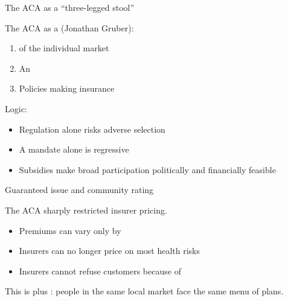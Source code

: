 \begin{frame}{The ACA as a ``three-legged stool''}

    The ACA as a  (Jonathan Gruber):
    \begin{enumerate}
        \item {} of the individual market
        \item An 
        \item Policies making insurance 
    \end{enumerate}

    \vspace{3mm}

    Logic:
    \begin{itemize}
        \item Regulation alone risks adverse selection
        \item A mandate alone is regressive
        \item Subsidies make broad participation politically and financially feasible
    \end{itemize}

\end{frame}
\begin{frame}{Guaranteed issue and community rating}

    The ACA sharply restricted insurer pricing.
    \begin{itemize}
        \item Premiums can vary only by 
        \item Insurers can no longer price on most health risks
        \item Insurers cannot refuse customers because of 
    \end{itemize}

    \vspace{3mm}

    This is  plus : people in the same local market face the same menu of plans.

\end{frame}
